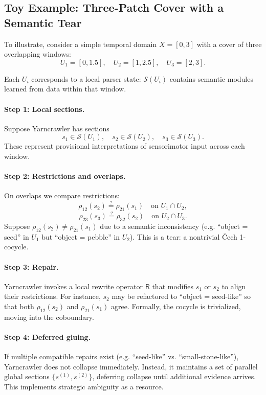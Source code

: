 \documentclass{article}
\begin{document}
\subsection{Toy Example: Three-Patch Cover with a Semantic Tear}

To illustrate, consider a simple temporal domain $X=[0,3]$ with a cover of three overlapping windows:
\[
U_1 = [0,1.5], \quad U_2 = [1,2.5], \quad U_3 = [2,3].
\]

Each $U_i$ corresponds to a local parser state: $\mathcal{S}(U_i)$ contains semantic modules learned from data within that window.

\paragraph{Step 1: Local sections.}
Suppose Yarncrawler has sections
\[
s_1 \in \mathcal{S}(U_1), \quad s_2 \in \mathcal{S}(U_2), \quad s_3 \in \mathcal{S}(U_3).
\]
These represent provisional interpretations of sensorimotor input across each window.

\paragraph{Step 2: Restrictions and overlaps.}
On overlaps we compare restrictions:
\[
\rho_{12}(s_2) \stackrel{?}{=} \rho_{21}(s_1) \quad\text{on } U_1 \cap U_2,
\]
\[
\rho_{23}(s_3) \stackrel{?}{=} \rho_{32}(s_2) \quad\text{on } U_2 \cap U_3.
\]
Suppose $\rho_{12}(s_2)\neq\rho_{21}(s_1)$ due to a semantic inconsistency (e.g. “object = seed” in $U_1$ but “object = pebble” in $U_2$). This is a tear: a nontrivial Čech 1-cocycle.

\paragraph{Step 3: Repair.}
Yarncrawler invokes a local rewrite operator $\mathsf{R}$ that modifies $s_1$ or $s_2$ to align their restrictions. For instance, $s_2$ may be refactored to “object = seed-like” so that both $\rho_{12}(s_2)$ and $\rho_{21}(s_1)$ agree. Formally, the cocycle is trivialized, moving into the coboundary.

\paragraph{Step 4: Deferred gluing.}
If multiple compatible repairs exist (e.g. “seed-like” vs. “small-stone-like”), Yarncrawler does not collapse immediately. Instead, it maintains a set of parallel global sections $\{s^{(1)},s^{(2)}\}$, deferring collapse until additional evidence arrives. This implements strategic ambiguity as a resource.
\end{document}
